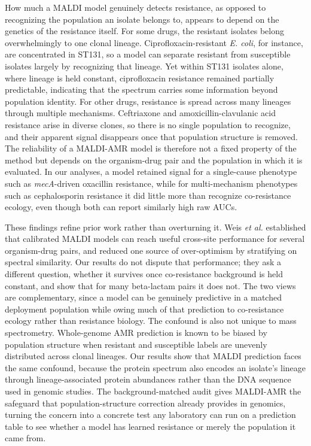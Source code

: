 \documentclass[11pt]{article}
\begin{document}
How much a MALDI model genuinely detects resistance, as opposed to recognizing the population an isolate belongs to, appears to depend on the genetics of the resistance itself. For some drugs, the resistant isolates belong overwhelmingly to one clonal lineage. Ciprofloxacin-resistant \textit{E. coli}, for instance, are concentrated in ST131, so a model can separate resistant from susceptible isolates largely by recognizing that lineage. Yet within ST131 isolates alone, where lineage is held constant, ciprofloxacin resistance remained partially predictable, indicating that the spectrum carries some information beyond population identity. For other drugs, resistance is spread across many lineages through multiple mechanisms. Ceftriaxone and amoxicillin-clavulanic acid resistance arise in diverse clones, so there is no single population to recognize, and their apparent signal disappears once that population structure is removed. The reliability of a MALDI-AMR model is therefore not a fixed property of the method but depends on the organism-drug pair and the population in which it is evaluated. In our analyses, a model retained signal for a single-cause phenotype such as \textit{mecA}-driven oxacillin resistance, while for multi-mechanism phenotypes such as cephalosporin resistance it did little more than recognize co-resistance ecology, even though both can report similarly high raw AUCs.

These findings refine prior work rather than overturning it. Weis \textit{et al.} established that calibrated MALDI models can reach useful cross-site performance for several organism-drug pairs, and reduced one source of over-optimism by stratifying on spectral similarity\cite{weis2022driams,weis2022stratification}. Our results do not dispute that performance; they ask a different question, whether it survives once co-resistance background is held constant, and show that for many beta-lactam pairs it does not. The two views are complementary, since a model can be genuinely predictive in a matched deployment population while owing much of that prediction to co-resistance ecology rather than resistance biology. The confound is also not unique to mass spectrometry. Whole-genome AMR prediction is known to be biased by population structure when resistant and susceptible labels are unevenly distributed across clonal lineages\cite{earle2016bacterialGwas,yu2025population}. Our results show that MALDI prediction faces the same confound, because the protein spectrum also encodes an isolate's lineage through lineage-associated protein abundances rather than the DNA sequence used in genomic studies. The background-matched audit gives MALDI-AMR the safeguard that population-structure correction already provides in genomics, turning the concern into a concrete test any laboratory can run on a prediction table to see whether a model has learned resistance or merely the population it came from.
\end{document}
